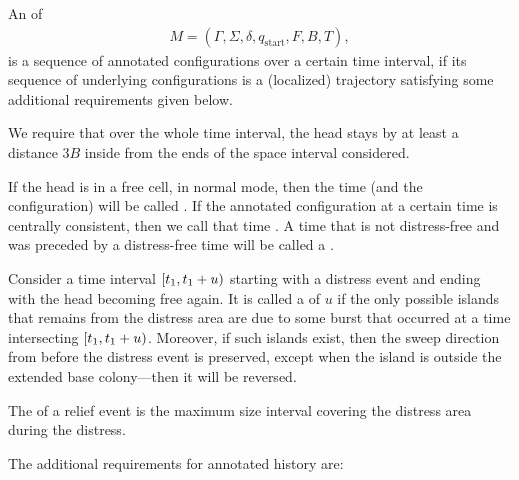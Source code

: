 \documentclass[12pt]{memoir}
\def\B{B}
\newcommand{\E}{E}
\newcommand{\R}{R}
\newcommand{\Tu}{T}
\newcommand{\start}{\mathrm{start}}
\begin{document}
\begin{definition}\label{def:annotated-hist}

    An  of
     \begin{align*}
        M=(\Gamma,\Sigma,\delta,q_{\start},F,B,\Tu{}),
     \end{align*}
    is a sequence of annotated configurations over a certain time interval,
    if its sequence of underlying configurations is a 
    (localized) trajectory satisfying some additional requirements given below.


    We require that over the whole time interval, the head stays by at least a
    distance \( 3\B \) inside from the ends of the space interval considered.

    If the head is in a free cell, in normal mode, then
    the time (and the configuration) will be called
    .
    If the annotated configuration at a certain time
    is centrally consistent, then we call
    that time .
    A time that is not distress-free and was preceded by
    a distress-free time
    will be called a .

    Consider a time interval \( [t_1,t_1+u) \) starting
    with a distress event and ending with the head
    becoming free again.
    It is called a  of  \( u \)
    if the only possible islands that remains from the distress area
    are due to some burst
    that occurred at a time intersecting \( [t_1,t_1 + u) \).
    Moreover, if such islands
    exist, then the sweep direction from before the
    distress event is preserved, except when the island is
    outside the extended base colony---then it will be reversed.

    The  of a relief event is the maximum size
    interval covering the distress area during the distress.

    The additional requirements for annotated history are:


\end{definition}
\end{document}
